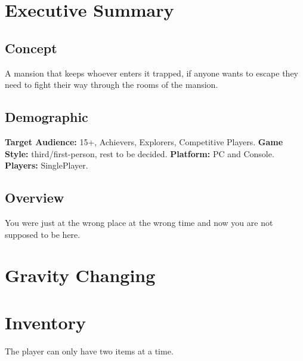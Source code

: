 \documentclass{article}
\begin{document}
\section{Executive Summary}
\subsection{Concept}
A mansion that keeps whoever enters it trapped, if anyone wants to escape they need
to fight their way through the rooms of the mansion.
\subsection{Demographic}
\textbf{Target Audience:} 15+, Achievers, Explorers, Competitive Players.
\newline
\textbf{Game Style:} third/first-person, rest to be decided.
\newline
\textbf{Platform:} PC and Console.
\newline
\textbf{Players:} SinglePlayer.
\subsection{Overview}
You were just at the wrong place at the wrong time and now you are not supposed to be
here.

\section{Gravity Changing}
\section{Inventory}
The player can only have two items at a time.
\end{document}
